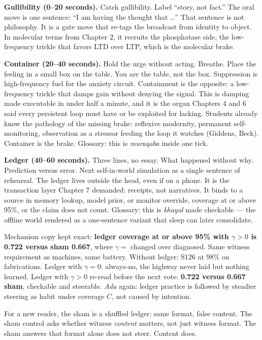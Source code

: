 \textbf{Gullibility (0--20 seconds).} Catch gullibility. Label ``story, not fact.'' The oral move is one sentence: ``I am having the thought that \dots'' That sentence is not philosophy. It is a gate move that re-tags the broadcast from identity to object. In molecular terms from Chapter 2, it recruits the phosphatase side, the low-frequency trickle that favors LTD over LTP, which is the molecular brake.

\textbf{Container (20--40 seconds).} Hold the urge without acting. Breathe. Place the feeling in a small box on the table. You are the table, not the box. Suppression is high-frequency fuel for the anxiety circuit. Containment is the opposite: a low-frequency trickle that damps gain without denying the signal. This is damping made executable in under half a minute, and it is the organ Chapters 4 and 6 said every persistent loop must have or be exploited for lacking. Students already know the pathology of the missing brake: reflexive modernity, permanent self-monitoring, observation as a stressor feeding the loop it watches (Giddens, Beck). Container is the brake. Glossary: this is \textit{muraqaba} inside one tick.

\textbf{Ledger (40--60 seconds).} Three lines, no essay. What happened without why. Prediction versus error. Next self-in-world simulation as a single sentence of rehearsal. The ledger lives outside the head, even if on a phone. It is the transaction layer Chapter 7 demanded: receipts, not narratives. It binds to a source in memory lookup, model prior, or monitor override, coverage at or above 95\%, or the claim does not count. Glossary: this is \textit{khayal} made checkable --- the offline world rendered as a one-sentence variant that sleep can later consolidate.

Mechanism copy kept exact: \textbf{ledger coverage at or above 95\% with $\gamma > 0$ is 0.722 versus sham 0.667}, where $\gamma = $ changed over diagnosed. Same witness requirement as machines, same battery. Without ledger: S126 at 98\% on fabrications. Ledger with $\gamma = 0$: always-no, the highway never laid but nothing learned. Ledger with $\gamma > 0$ re-read before the next vote: \textbf{0.722 versus 0.667 sham}, checkable and steerable. \textit{Ada} again: ledger practice is followed by steadier steering as habit under coverage $C$, not caused by intention.

For a new reader, the sham is a shuffled ledger: same format, false content. The sham control asks whether witness \textit{content} matters, not just witness format. The sham answers that format alone does not steer. Content does.

